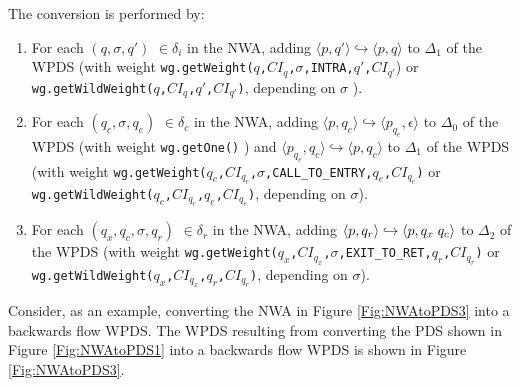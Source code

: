 \noindent The conversion is performed by:

\begin{enumerate}

\item For each $(q,\sigma,q')$ $\in \delta_i$ in the NWA, adding $\langle
  p,q' \rangle \hookrightarrow \langle p,q \rangle$ to $\Delta_1$ of the WPDS
  (with weight
  \texttt{wg.getWeight($q$,$CI_q$,$\sigma$,INTRA,$q'$,$CI_{q'}$}) or
  \texttt{wg.getWildWeight($q$,$CI_q$,$q'$,$CI_{q'}$)}, depending on $\sigma$
  ).

\item For each $(q_c,\sigma, q_e)$ $\in \delta_c$ in the NWA, adding $\langle
  p,q_e \rangle \hookrightarrow \langle p_{q_e},\epsilon \rangle$ to
  $\Delta_0$ of the WPDS (with weight \texttt{wg.getOne()} ) and $\langle
  p_{q_e},q_c \rangle \hookrightarrow \langle p,q_c \rangle$ to $\Delta_1$ of
  the WPDS (with weight
  \texttt{wg.getWeight($q_c$,$CI_{q_c}$,$\sigma$,CALL\_TO\_ENTRY,$q_e$,$CI_{q_e}$)}
  or \texttt{wg.getWildWeight($q_c$,$CI_{q_c}$,$q_e$,$CI_{q_e}$)}, depending
  on $\sigma$).

\item For each $(q_x,q_c,\sigma,q_r)$ $\in \delta_r$ in the NWA, adding
  $\langle p,q_r \rangle \hookrightarrow \langle p,q_x \hspace{.1cm} q_c
  \rangle$ to $\Delta_2$ of the WPDS (with weight
  \texttt{wg.getWeight($q_x$,$CI_{q_x}$,$\sigma$,EXIT\_TO\_RET,$q_r$,$CI_{q_r}$)}
  or \texttt{wg.getWildWeight($q_x$,$CI_{q_x}$,$q_r$,$CI_{q_r}$)}, depending
  on $\sigma$).
\end{enumerate}

\noindent Consider, as an example, converting the NWA in Figure
\ref{Fig:NWAtoPDS3} into a backwards flow WPDS.  The WPDS resulting from
converting the PDS shown in Figure \ref{Fig:NWAtoPDS1} into a backwards flow
WPDS is shown in Figure \ref{Fig:NWAtoPDS3}. \\

